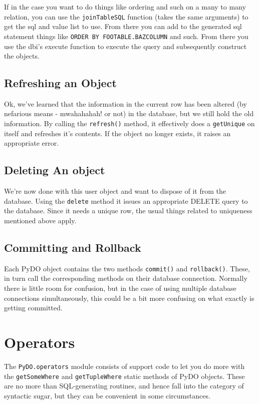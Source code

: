 \documentclass[titlepage]{manual}
\begin{document}
If in the case you want to do things like ordering and such on a many
to many relation, you can use the \texttt{joinTableSQL} function
(takes the same arguments) to get the sql and value list to use.  From
there you can add to the generated sql statement things like
\texttt{ORDER BY FOOTABLE.BAZCOLUMN} and such.  From there you use the
dbi's execute function to execute the query and subsequently construct
the objects.

\section{Refreshing an Object}
Ok, we've learned that the information in the current row has been
altered (by nefarious means - mwahahahah!  or not) in the database,
but we still hold the old information.  By calling the
\texttt{refresh()} method, it effectively does a \texttt{getUnique} on
itself and refreshes it's contents.  If the object no longer exists,
it raises an appropriate error.


\section{Deleting An object}
We're now done with this user object and want to dispose of it from
the database.  Using the \texttt{delete} method it issues an
appropriate DELETE query to the database.  Since it needs a unique
row, the usual things related to uniqueness mentioned above apply.


\section{Committing and Rollback}
Each PyDO object contains the two methods \texttt{commit()} and
\texttt{rollback()}.  These, in turn call the corresponding methods on
their database connection.  Normally there is little room for
confusion, but in the case of using multiple database connections
simultaneously, this could be a bit more confusing on what exactly is
getting committed.

\chapter{Operators}
\label{operators}

The \texttt{PyDO.operators} module consists of support code to let you
do more with the \texttt{getSomeWhere} and \texttt{getTupleWhere}
static methods of PyDO objects.  These are no more than SQL-generating
routines, and hence fall into the category of syntactic sugar, but
they can be convenient in some circumstances.
\end{document}
